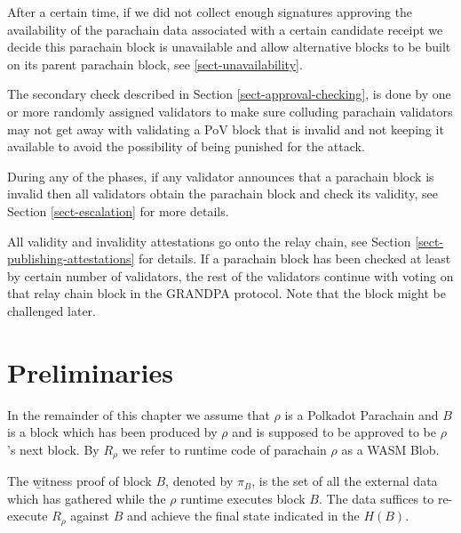 After a certain time, if we did not collect enough signatures approving the availability of the parachain data associated with a certain candidate receipt we decide this parachain block is unavailable and allow alternative blocks to be built on its parent parachain block, see \ref{sect-unavailability}.
\newline

The secondary check described in Section \ref{sect-approval-checking}, is done by one or more randomly assigned validators to make sure colluding parachain validators may not get away with validating a PoV block that is invalid and not keeping it available to avoid the possibility of being punished for the attack.
\newline

During any of the phases, if any validator announces that a parachain block is invalid then all validators obtain the parachain block and check its validity, see Section \ref{sect-escalation} for more details.
\newline

All validity and invalidity attestations go onto the relay chain, see Section \ref{sect-publishing-attestations} for details. If a parachain block has been checked at least by certain number of validators, the rest of the validators continue with voting on that relay chain block in the GRANDPA protocol. Note that the block might be challenged later.
\newline

\section{Preliminaries}

\begin{definition}
In the remainder of this chapter we assume that $\rho$ is a Polkadot Parachain and $B$ is a block which has been produced by $\rho$ and is supposed to be approved to be $\rho$'s next block. By $R_{\rho}$ we refer to runtime code of parachain $\rho$  as a WASM Blob.
\end{definition}

\begin{definition}
  \label{defn-witness-proof}
  The {\b witness proof} of block $B$, denoted by {\bf $\pi_B$}, is the set of all the external data which has gathered while the $\rho$ runtime executes block $B$. The data suffices to re-execute $R_{\rho}$ against $B$ and achieve the final state indicated in the $H(B)$.
\end{definition}

